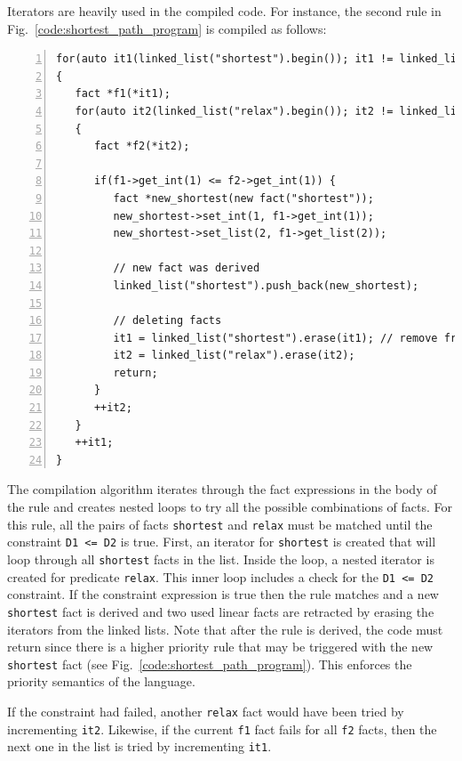 Iterators are heavily used in the compiled code. For instance, the second rule in
Fig.~\ref{code:shortest_path_program} is compiled as follows:

\begin{Verbatim}[numbers=left,fontsize=\codesize]
for(auto it1(linked_list("shortest").begin()); it1 != linked_list("shortest").end(); )
{
   fact *f1(*it1);
   for(auto it2(linked_list("relax").begin()); it2 != linked_list("relax").end(); )
   {
      fact *f2(*it2);

      if(f1->get_int(1) <= f2->get_int(1)) {
         fact *new_shortest(new fact("shortest"));
         new_shortest->set_int(1, f1->get_int(1));
         new_shortest->set_list(2, f1->get_list(2));

         // new fact was derived
         linked_list("shortest").push_back(new_shortest);

         // deleting facts
         it1 = linked_list("shortest").erase(it1); // remove from list
         it2 = linked_list("relax").erase(it2);
         return;
      }
      ++it2;
   }
   ++it1;
}
\end{Verbatim}


The compilation algorithm iterates through the fact expressions in the body of
the rule and creates nested loops to try all the possible combinations of facts.
For this rule, all the pairs of facts \texttt{shortest} and \texttt{relax} must
be matched until the constraint \texttt{D1 <= D2} is true. First, an iterator
for \texttt{shortest} is created that will loop through all \texttt{shortest}
facts in the list. Inside the loop, a nested iterator is created for predicate
\texttt{relax}. This inner loop includes a check for the \texttt{D1 <= D2}
constraint. If the constraint expression is true then the rule matches and a new
\texttt{shortest} fact is derived and two used linear facts are retracted by
erasing the iterators from the linked lists. Note that after the rule is
derived, the code must return since there is a higher priority rule that may be
triggered with the new \texttt{shortest} fact (see
Fig.~\ref{code:shortest_path_program}). This enforces the priority semantics
of the language.
    
If the constraint had failed, another \texttt{relax} fact would have been tried
by incrementing \texttt{it2}. Likewise, if the current \texttt{f1} fact fails
for all \texttt{f2} facts, then the next one in the list is tried
by incrementing \texttt{it1}.

